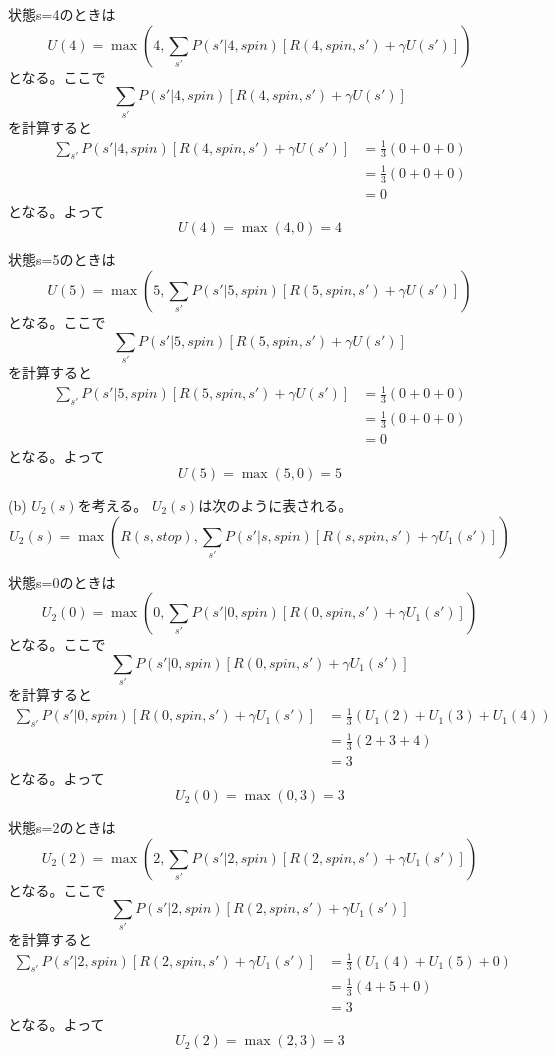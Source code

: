 \documentclass[a4paper,11pt,dvipdfmx]{jsarticle}
\begin{document}
状態s=4のときは
\[U(4)=\max(4, \sum_{s'}P(s'|4,spin)[R(4,spin,s')+\gamma U(s')])\]
となる。ここで
\[\sum_{s'}P(s'|4,spin)[R(4,spin,s')+\gamma U(s')]\]
を計算すると
\begin{align*}
    \sum_{s'}P(s'|4,spin)[R(4,spin,s')+\gamma U(s')] &= \frac{1}{3}(0+0+0) \\
                                                     &= \frac{1}{3}(0+0+0) \\
                                                     &= 0
\end{align*}
となる。よって
\[U(4)=\max(4,0)=4\]

状態s=5のときは
\[U(5)=\max(5, \sum_{s'}P(s'|5,spin)[R(5,spin,s')+\gamma U(s')])\]
となる。ここで
\[\sum_{s'}P(s'|5,spin)[R(5,spin,s')+\gamma U(s')]\]
を計算すると
\begin{align*}
    \sum_{s'}P(s'|5,spin)[R(5,spin,s')+\gamma U(s')] &= \frac{1}{3}(0+0+0) \\
                                                     &= \frac{1}{3}(0+0+0) \\
                                                     &= 0
\end{align*}
となる。よって
\[U(5)=\max(5,0)=5\]

(b)
\(U_2(s)\)を考える。
\(U_2(s)\)は次のように表される。
\[U_2(s)=\max(R(s,stop), \sum_{s'}P(s'|s,spin)[R(s,spin,s')+\gamma U_1(s')])\]

状態s=0のときは
\[U_2(0)=\max(0, \sum_{s'}P(s'|0,spin)[R(0,spin,s')+\gamma U_1(s')])\]
となる。ここで
\[\sum_{s'}P(s'|0,spin)[R(0,spin,s')+\gamma U_1(s')]\]
を計算すると
\begin{align*}
    \sum_{s'}P(s'|0,spin)[R(0,spin,s')+\gamma U_1(s')] &= \frac{1}{3}(U_1(2)+U_1(3)+U_1(4)) \\
                                                     &= \frac{1}{3}(2+3+4) \\
                                                     &= 3
\end{align*}
となる。よって
\[U_2(0)=\max(0,3)=3\]

状態s=2のときは
\[U_2(2)=\max(2, \sum_{s'}P(s'|2,spin)[R(2,spin,s')+\gamma U_1(s')])\]
となる。ここで
\[\sum_{s'}P(s'|2,spin)[R(2,spin,s')+\gamma U_1(s')]\]
を計算すると
\begin{align*}
    \sum_{s'}P(s'|2,spin)[R(2,spin,s')+\gamma U_1(s')] &= \frac{1}{3}(U_1(4)+U_1(5)+0) \\
                                                     &= \frac{1}{3}(4+5+0) \\
                                                     &= 3
\end{align*}
となる。よって
\[U_2(2)=\max(2,3)=3\]
\end{document}
